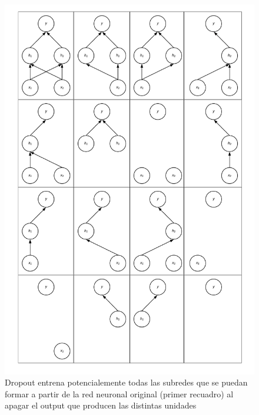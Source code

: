 \begin{figure}[H]
\captionsetup{font=small,labelfont=small}
\caption{Dropout entrena potencialemente todas las subredes que se puedan formar a partir de la red neuronal original (primer recuadro) al apagar el output que producen las distintas unidades}
\centering
\includegraphics[scale=.25]{img/Dropout.png}
\end{figure}


